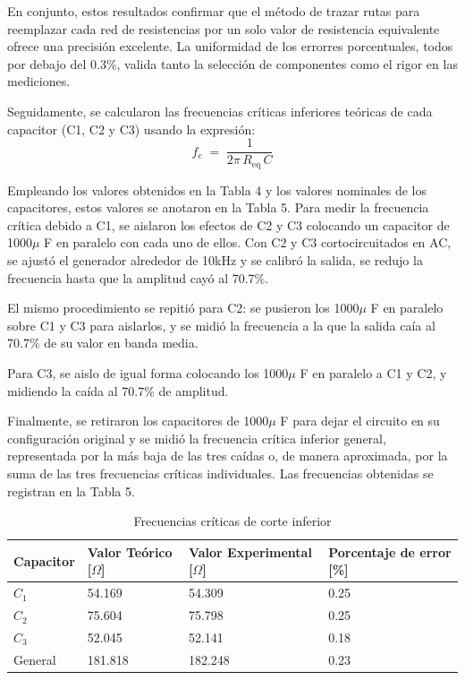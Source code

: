 \documentclass[journal]{IEEEtran}
\begin{document}
\par En conjunto, estos resultados confirmar que el método de trazar rutas para reemplazar cada red de resistencias por un solo valor de resistencia equivalente ofrece una precisión excelente. La uniformidad de los errorres porcentuales, todos por debajo del 0.3\%, valida tanto la selección de componentes como el rigor en las mediciones.
\par Seguidamente, se calcularon las frecuencias críticas inferiores teóricas de cada capacitor (C1, C2 y C3) usando la expresión:
\begin{equation}
f_c \;=\;\frac{1}{2\pi\,R_{\mathrm{eq}}\,C}
\end{equation}
\par Empleando los valores obtenidos en la Tabla 4 y los valores nominales de los capacitores, estos valores se anotaron en la Tabla 5. Para medir la frecuencia crítica debido a C1, se aislaron los efectos de C2 y C3 colocando un capacitor de 1000$\mu$ F en paralelo con cada uno de ellos. Con C2 y C3 cortocircuitados en AC, se ajustó el generador alrededor de 10kHz y se calibró la salida, se redujo la frecuencia hasta que la amplitud cayó al 70.7\%.
\par El mismo procedimiento se repitió para C2: se pusieron los 1000$\mu$ F en paralelo sobre C1 y C3 para aislarlos, y se midió la frecuencia a la que la salida caía al 70.7\% de su valor en banda media.
\par Para C3, se aislo de igual forma colocando los 1000$\mu$ F en paralelo a C1 y C2, y midiendo la caída al 70.7\% de amplitud. 
\par Finalmente, se retiraron los capacitores de 1000$\mu$ F para dejar el circuito en su configuración original y se midió la frecuencia crítica inferior general, representada por la más baja de las tres caídas o, de manera aproximada, por la suma de las tres frecuencias críticas individuales. Las frecuencias obtenidas se registran en la Tabla 5.
\begin{table}[h]
    \caption{Frecuencias críticas de corte inferior}
    \centering
    \renewcommand{\arraystretch}{1.2} %
    \begin{tabular}{|l|p{2cm}|p{2cm}|p{2cm}|}
        \hline
        {Capacitor} & \textbf{Valor Teórico [$\Omega$]} & \textbf{Valor Experimental [$\Omega$]} & \textbf{Porcentaje de error [\%]} \\
        \hline
        $C_1$    & 54.169 & 54.309 & 0.25 \\ \hline
        $C_2$    & 75.604 & 75.798 & 0.25 \\ \hline
        $C_3$    & 52.045 & 52.141 & 0.18 \\ \hline
        General  & 181.818 & 182.248 & 0.23 \\ \hline
    \end{tabular}
    \label{tab:frecuencias_criticas}
\end{table}
\end{document}
